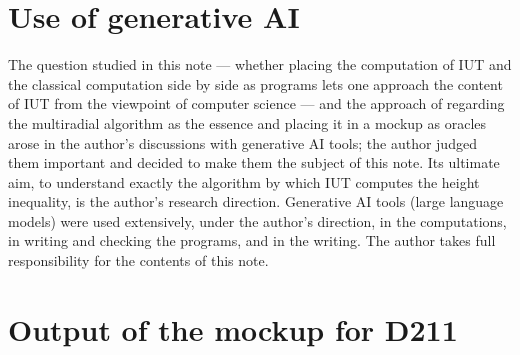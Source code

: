 \documentclass[11pt,a4paper]{article}
\begin{document}
\section*{Use of generative AI}
The question studied in this note --- whether placing the computation of IUT and the classical computation side by side
as programs lets one approach the content of IUT from the viewpoint of computer science --- and the approach of regarding
the multiradial algorithm as the essence and placing it in a mockup as oracles arose in the author's discussions with
generative AI tools; the author judged them important and decided to make them the subject of this note. Its ultimate
aim, to understand exactly the algorithm by which IUT computes the height inequality, is the author's research
direction. Generative AI tools (large language models) were used extensively, under the author's direction, in the
computations, in writing and checking the programs, and in the writing. The author takes full responsibility for the
contents of this note.

\appendix
\section{Output of the mockup for D211}
\end{document}
